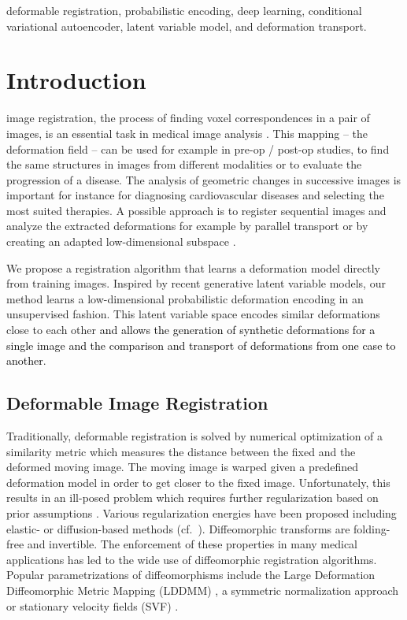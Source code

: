 \documentclass[journal]{IEEEtran}
\newcommand{\update}[1]{\textcolor{black}{#1}}
\begin{document}
\begin{IEEEkeywords}
deformable registration, probabilistic encoding, deep learning, conditional variational autoencoder, latent variable model, and deformation transport.
\end{IEEEkeywords}



\IEEEpeerreviewmaketitle


\section{Introduction}
 image registration, the process of finding voxel correspondences in a pair of images, is an essential task in medical image analysis \cite{sotiras}. This mapping -- the deformation field -- can be used for example in pre-op / post-op studies, to find the same structures in images from different modalities or to evaluate the progression of a disease. The analysis of geometric changes in successive images is important for instance for diagnosing cardiovascular diseases and selecting the most suited therapies. A possible approach is to register sequential images and analyze the extracted deformations for example by parallel transport \cite{lorenzi2014efficient} or by creating an adapted low-dimensional subspace \cite{rohe2018low}. 

We propose a registration algorithm that learns a deformation model directly from training images. Inspired by recent generative latent variable models, our method learns a low-dimensional probabilistic deformation encoding in an unsupervised fashion. This latent variable space encodes similar deformations close to each other \update{and allows the generation of synthetic deformations for a single image and the comparison and transport of deformations from one case to another}.

\subsection{Deformable Image Registration}
Traditionally, deformable registration is solved by numerical optimization of a similarity metric which measures the distance between the fixed and the deformed moving image. The moving image is warped given a predefined deformation model in order to get closer to the fixed image. Unfortunately, this results in an ill-posed problem which requires further regularization based on prior assumptions \cite{sotiras}. Various regularization energies have been proposed including elastic- \cite{davatzikos1997spatial,burger2013hyperelastic} or diffusion-based methods \cite{thirion1998image,vercauteren2007non,lorenzi2013lcc} (cf.~\cite{sotiras}).  Diffeomorphic transforms are folding-free and invertible. The enforcement of these properties in many medical applications has led to the wide use of diffeomorphic registration algorithms. Popular parametrizations of diffeomorphisms include the Large Deformation Diffeomorphic Metric Mapping (LDDMM) \update{\cite{beg2005computing,cao2005large,zhang2015finite}}, a symmetric normalization approach \cite{avants2008symmetric} or stationary velocity fields (SVF) \cite{arsigny2006log,vercauteren2008symmetric}.
\end{document}

